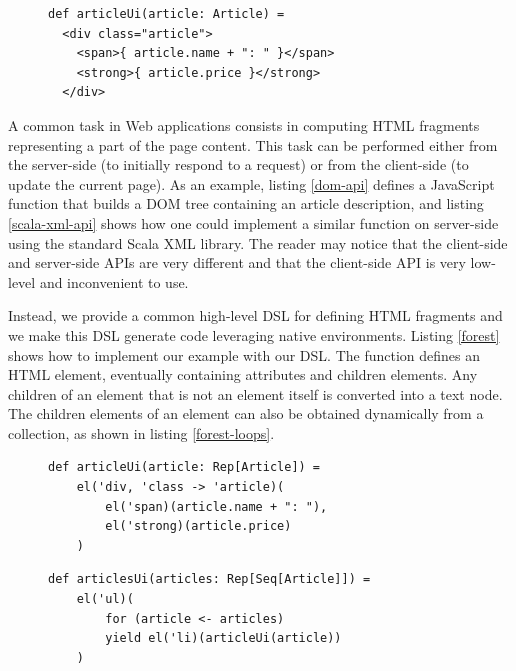 \documentclass[preprint]{sigplanconf}
\begin{document}
\begin{figure}
\begin{lstlisting}[caption=Scala XML API,label=scala-xml-api,captionpos=b]
def articleUi(article: Article) =
  <div class="article">
    <span>{ article.name + ": " }</span>
    <strong>{ article.price }</strong>
  </div>
\end{lstlisting}
\end{figure}

A common task in Web applications consists in computing HTML fragments representing a part of the
page content. This task can be performed either from the server-side (to initially respond to a
request) or from the client-side (to update the current page). As an example, listing \ref{dom-api}
defines a JavaScript function  that builds a DOM tree containing an article
description, and listing \ref{scala-xml-api} shows how one could implement a similar function on
server-side using the standard Scala XML library. The reader may notice that the client-side
and server-side APIs are very different and that the client-side API is very low-level and
inconvenient to use.

Instead, we provide a common high-level DSL for defining HTML fragments and we make this DSL
generate code leveraging native environments. Listing \ref{forest} shows how to implement our
example with our DSL. The  function defines an HTML element, eventually containing
attributes and children elements. Any children of an element that is not an element itself is
converted into a text node. The children elements of an element can also be obtained
dynamically from a collection, as shown in listing \ref{forest-loops}.

\begin{figure}
\begin{lstlisting}[label=forest,caption=DOM definition DSL,captionpos=b]
def articleUi(article: Rep[Article]) =
    el('div, 'class -> 'article)(
        el('span)(article.name + ": "),
        el('strong)(article.price)
    )
\end{lstlisting}
\end{figure}

\begin{figure}
\begin{lstlisting}[label=forest-loops,caption=Using loops,captionpos=b]
def articlesUi(articles: Rep[Seq[Article]]) =
    el('ul)(
        for (article <- articles)
        yield el('li)(articleUi(article))
    )
\end{lstlisting}
\end{figure}
\end{document}
